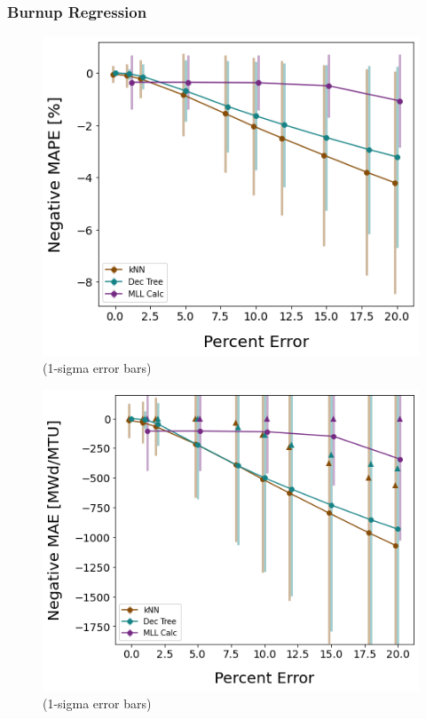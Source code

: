 \begin{frame}
  \frametitle{Burnup Regression}
  \begin{adjustwidth}{-15pt}{-5pt}
  \begin{minipage}{0.5\textwidth}
    \begin{figure}
      \centering
      \includegraphics[width=\textwidth]{./figures/randerr_compare_nuc29_MAPE_burn.png}
      \scriptsize (1-sigma error bars)
    \end{figure}
  \end{minipage}%
  \hfill
  \begin{minipage}{0.5\textwidth}
    \begin{figure}
      \centering
      \includegraphics[width=1.05\textwidth]{./figures/randerr_compare_nuc29_MAE_burn.png}
      \scriptsize (1-sigma error bars)
    \end{figure}
  \end{minipage}
  \end{adjustwidth}
\end{frame}

